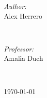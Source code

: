 \begin{titlepage}
\begin{minipage}{0.4\textwidth}
\begin{flushleft} \large
\emph{Author:}\\
Alex Herrero \\
\end{flushleft}
\end{minipage}
~
\begin{minipage}{0.4\textwidth}
\begin{flushright} \large
\emph{Professor:} \\
Amalia Duch
\end{flushright}
\end{minipage}\\[2cm]
\makeatother


\vspace{8cm}
{\large \today}\\[1cm] %

\vfill %

\end{titlepage}
